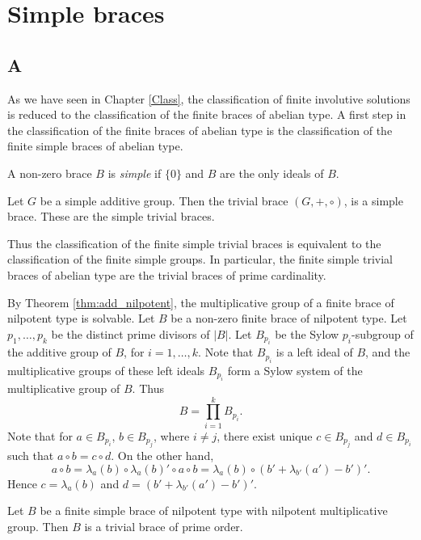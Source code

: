 \chapter{Simple braces}
\label{Sbraces}

\section*{A}

As we have seen in Chapter \ref{Class}, the classification of finite involutive solutions is reduced to the classification of the finite  braces of abelian type. A first step in the classification of the finite braces of abelian type is the classification of the finite simple braces of abelian type.

\begin{definition}
A non-zero brace $B$ is \emph{simple} if $\{0\}$ and $B$ are the only ideals of $B$.
\end{definition}


\begin{example}
Let $G$ be a simple additive group. Then the trivial brace $(G,+, \circ )$, is a simple brace. These are the simple trivial braces.
\end{example}

Thus the classification of the finite simple trivial braces is equivalent to the classification of the finite simple groups.
In particular, the finite simple trivial braces of abelian type are the trivial braces of prime cardinality. 

By Theorem \ref{thm:add_nilpotent}, the multiplicative group of a finite brace of nilpotent type is solvable. Let $B$ be a non-zero finite brace of nilpotent type. Let $p_1,\dots ,p_k$ be the distinct prime divisors of $|B|$. Let $B_{p_i}$ be the Sylow $p_i$-subgroup of the additive group of $B$, for $i=1,\dots ,k$. Note that $B_{p_i}$ is a left ideal of $B$, and the multiplicative groups of these left ideals $B_{p_i}$ form a Sylow system of the multiplicative group of $B$. Thus
$$B=\prod_{i=1}^kB_{p_i}.$$
Note that for $a\in B_{p_i}$, $b\in B_{p_j}$, where $i\neq j$, there exist unique $c\in B_{p_j}$ and $d\in B_{p_i}$ such that $a\circ b=c\circ d$. On the other hand, 
$$a\circ b=\lambda_a(b)\circ \lambda_a(b)'\circ a\circ b=\lambda_a(b)\circ (b'+\lambda_{b'}(a')-b')'.$$
Hence $c=\lambda_a(b)$ and $d=(b'+\lambda_{b'}(a')-b')'$.
    


\begin{lemma}
    \label{lem:nilpotentsimple}
    Let $B$ be a finite simple brace of nilpotent type with nilpotent multiplicative group. Then $B$ is a trivial brace of prime order. 
\end{lemma}

